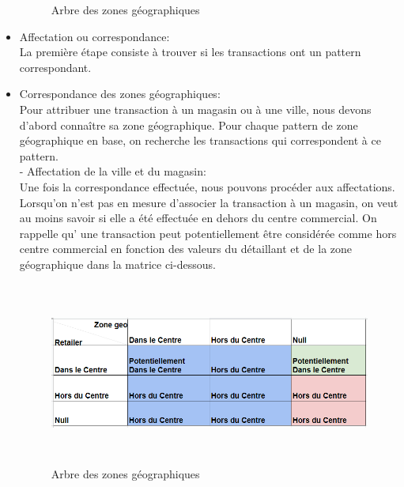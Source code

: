 \begin{itemize}
\begin{figure}[h]
\begin{center}
\caption[Arbre des zones géographiques]{Arbre des zones géographiques}
\label{monlabel}
\end{center}
\end{figure}
\item Affectation ou correspondance:\\
La première étape consiste à trouver si les transactions ont un pattern correspondant.
\item Correspondance des zones géographiques:\\ 
Pour attribuer une transaction à un magasin ou à une ville, nous devons d'abord connaître sa zone géographique. Pour chaque pattern de zone géographique en base, on recherche les transactions qui correspondent à ce pattern. \\
- Affectation de la ville et du magasin:\\
Une fois la correspondance effectuée, nous pouvons procéder aux affectations. Lorsqu'on n'est pas en mesure d'associer la transaction à un magasin, on veut au moins savoir si elle a été effectuée en dehors du centre commercial. On rappelle qu’ une transaction peut potentiellement être considérée comme hors centre commercial en fonction des valeurs du détaillant et de la zone géographique dans la matrice ci-dessous.
\newpage 
\begin{figure}[h]
\begin{center}
\includegraphics[width=15cm,height=6cm]{images/inmall_outmall.png}
\caption[Règle d'affectation des transaction dans le centre et en déhors]{Arbre des zones géographiques}
\label{monlabel}
\end{center}
\end{figure}



\end{itemize}
